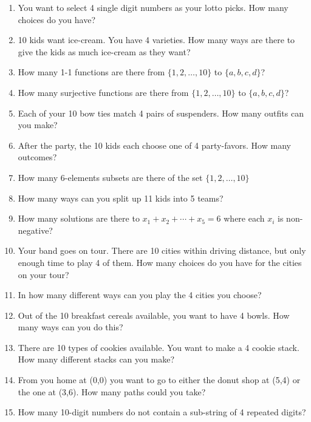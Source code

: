 \documentclass[10pt,]{book}
\theoremstyle{plain}
\theoremstyle{definition}
\numberwithin{equation}{chapter}
\begin{document}
\begin{exerciselist}
\begin{enumerate}[label=(\alph*)]
\item\hypertarget{li-385}{}
                You want to select 4 single digit numbers as your lotto picks. How many choices do you have?
\item\hypertarget{li-386}{}
                10 kids want ice-cream. You have 4 varieties. How many ways are there to give the kids as much ice-cream as they want?
\item\hypertarget{li-387}{}
                How many 1-1 functions are there from \(\{1,2,\ldots, 10\}\) to \(\{a,b,c,d\}\)?
\item\hypertarget{li-388}{}
                How many surjective functions are there from \(\{1,2,\ldots, 10\}\) to \(\{a,b,c,d\}\)?
\item\hypertarget{li-389}{}
                Each of your 10 bow ties match 4 pairs of suspenders. How many outfits can you make?
\item\hypertarget{li-390}{}
                After the party, the 10 kids each choose one of 4 party-favors. How many outcomes?
\item\hypertarget{li-391}{}
                How many 6-elements subsets are there of the set \(\{1,2,\ldots, 10\}\)
\item\hypertarget{li-392}{}
                How many ways can you split up 11 kids into 5 teams?
\item\hypertarget{li-393}{}
                How many solutions are there to \(x_1 + x_2 + \cdots + x_5 = 6\) where each \(x_i\) is non-negative?
\item\hypertarget{li-394}{}
                Your band goes on tour. There are 10 cities within driving distance, but only enough time to play 4 of them. How many choices do you have for the cities on your tour?
\item\hypertarget{li-395}{}
                In how many different ways can you play the 4 cities you choose?
\item\hypertarget{li-396}{}
                Out of the 10 breakfast cereals available, you want to have 4 bowls. How many ways can you do this?
\item\hypertarget{li-397}{}
                There are 10 types of cookies available. You want to make a 4 cookie stack. How many different stacks can you make?
\item\hypertarget{li-398}{}
                From you home at (0,0) you want to go to either the donut shop at (5,4) or the one at (3,6). How many paths could you take?
\item\hypertarget{li-399}{}
                How many 10-digit numbers do not contain a sub-string of 4 repeated digits?
\end{enumerate}


\end{exerciselist}
\end{document}
